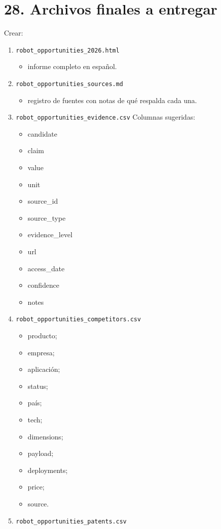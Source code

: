 \documentclass[11pt,a4paper]{article}
\begin{document}
\section*{28. Archivos finales a entregar}
Crear:

\begin{enumerate}
\item \texttt{robot\_opportunities\_2026.html}
\begin{itemize}
\item informe completo en español.
\end{itemize}
\item \texttt{robot\_opportunities\_sources.md}
\begin{itemize}
\item registro de fuentes con notas de qué respalda cada una.
\end{itemize}
\item \texttt{robot\_opportunities\_evidence.csv}
Columnas sugeridas:
\begin{itemize}
\item candidate
\item claim
\item value
\item unit
\item source\_id
\item source\_type
\item evidence\_level
\item url
\item access\_date
\item confidence
\item notes
\end{itemize}
\item \texttt{robot\_opportunities\_competitors.csv}
\begin{itemize}
\item producto;
\item empresa;
\item aplicación;
\item status;
\item país;
\item tech;
\item dimensions;
\item payload;
\item deployments;
\item price;
\item source.
\end{itemize}
\item \texttt{robot\_opportunities\_patents.csv}

\end{enumerate}
\end{document}
